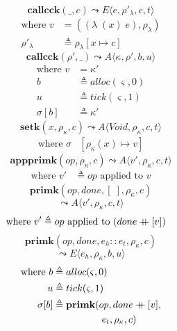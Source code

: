 \documentclass[12pt,draft]{article}
\newcommand\mdoubleplus{\ensuremath{\mathbin{+\mkern-9mu+}}}
\newcommand{\singlelamsyn}[2]{(\lambda\;(#1)\;#2)}
\begin{document}
\begin{multicols*}{2}
\[
\textbf{callcck}(\_, c)
\leadsto
E\langle
e , \rho'_{\lambda} , c , t
\rangle
\]
\vspace{-13mm}
\begin{align*}
\text{where } v &= (\singlelamsyn{x}{e} , \rho_{\lambda}) \\
\rho'_{\lambda} &\triangleq \rho_{\lambda}[x \mapsto c]
\end{align*}
\[
\textbf{callcck}(\rho' , \_)
\leadsto
A\langle
\kappa , \rho' , b , u
\rangle
\]
\vspace{-10mm}
\begin{align*}
\text{where } v &= \kappa' \\
b &\triangleq alloc(\varsigma, 0) \\
u &\triangleq tick(\varsigma, 1) \\
\sigma[b] &\triangleq \kappa'
\end{align*}
\[
\textbf{setk}(x, \rho_{\kappa}, c)
\leadsto
A\langle
\textit{Void} , \rho_{\kappa} , c , t
\rangle
\]
\vspace{-10mm}
\begin{align*}
\text{where } \sigma&[\rho_{\kappa}(x) \mapsto v]
\end{align*}
\[
\textbf{appprimk}(op, \rho_{\kappa}, c)
\leadsto
A\langle
v' , \rho_{\kappa} , c , t
\rangle
\]
\vspace{-12mm}
\begin{align*}
\text{where } v' &\triangleq op \text{ applied to } v
\end{align*}
\[
\textbf{primk}(op, done, [\;], \rho_{\kappa}, c)
\]
\vspace{-7mm}
\[
\leadsto
A\langle
v' , \rho_{\kappa} , c , t
\rangle
\]
\vspace{-12mm}
\begin{align*}
\text{where } v' &\triangleq op \text{ applied to } (done \mdoubleplus [v])
\end{align*}
\[
\textbf{primk}(op, done, e_h::e_t,\rho_{\kappa}, c)
\]
\vspace{-7mm}
\[
\leadsto
E\langle
e_h , \rho_{\kappa} , b , u
\rangle
\]
\vspace{-11mm}
\begin{align*}
\text{where } b &\triangleq alloc(\varsigma, 0) \\
u &\triangleq tick(\varsigma, 1) \\
\sigma[b] &\triangleq \textbf{primk}(op, done \mdoubleplus [v], \\
&\;\;\;\;\;\;\;\;\;\;\;\;\;\;\;\;\;\; e_t, \rho_{\kappa}, c)
\end{align*}
\end{multicols*}
\newpage
\end{document}
